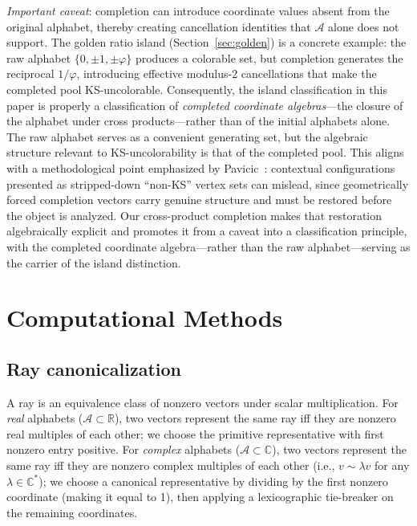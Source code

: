 \documentclass[12pt,a4paper]{article}
\newcommand{\R}{\mathbb{R}}
\newcommand{\C}{\mathbb{C}}
\begin{document}
\emph{Important caveat}: completion can introduce coordinate values absent from the original alphabet, thereby creating cancellation identities that $\mathcal{A}$ alone does not support.  The golden ratio island (Section~\ref{sec:golden}) is a concrete example: the raw alphabet $\{0, \pm 1, \pm\varphi\}$ produces a colorable set, but completion generates the reciprocal $1/\varphi$, introducing effective modulus-2 cancellations that make the completed pool KS-uncolorable.  Consequently, the island classification in this paper is properly a classification of \emph{completed coordinate algebras}---the closure of the alphabet under cross products---rather than of the initial alphabets alone.  The raw alphabet serves as a convenient generating set, but the algebraic structure relevant to KS-uncolorability is that of the completed pool.  This aligns with a methodological point emphasized by Pavicic~\cite{Pavicic2026engineering}: contextual configurations presented as stripped-down ``non-KS'' vertex sets can mislead, since geometrically forced completion vectors carry genuine structure and must be restored before the object is analyzed.  Our cross-product completion makes that restoration algebraically explicit and promotes it from a caveat into a classification principle, with the completed coordinate algebra---rather than the raw alphabet---serving as the carrier of the island distinction.

\section{Computational Methods}\label{sec:methods}

\subsection{Ray canonicalization}\label{sec:canon}

A ray is an equivalence class of nonzero vectors under scalar multiplication. For \emph{real} alphabets ($\mathcal{A} \subset \R$), two vectors represent the same ray iff they are nonzero real multiples of each other; we choose the primitive representative with first nonzero entry positive. For \emph{complex} alphabets ($\mathcal{A} \subset \C$), two vectors represent the same ray iff they are nonzero complex multiples of each other (i.e., $v \sim \lambda v$ for any $\lambda \in \C^*$); we choose a canonical representative by dividing by the first nonzero coordinate (making it equal to 1), then applying a lexicographic tie-breaker on the remaining coordinates.
\end{document}
